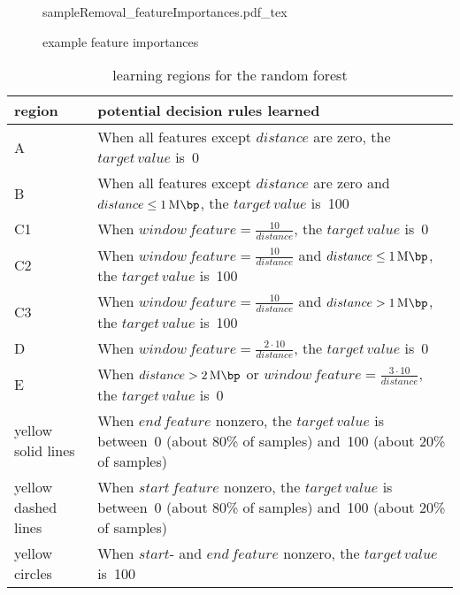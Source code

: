 \begin{figure}[p]
 \centering
 \scriptsize
  {sampleRemoval_featureImportances.pdf_tex}
 \caption{example feature importances}
 \label{fig:improve:featureImportance}
\end{figure}

\begin{table}
 \centering
 \begin{tabular}{lL{9cm}}
  \hline
  \textbf{region} 	& \textbf{potential decision rules learned} \\ \hline
  A		& When all features except $distance$ are zero, the $target\,value$ is~0 \\[1mm]
  B		& When all features except $distance$ are zero and $distance \leq \SI{1}{\mega\bp}$, the $target\,value$ is~100 \\[1mm]
  C1		& When $window\,feature = \frac{10}{distance}$, the $target\,value$ is~0 \\[1mm]
  C2		& When $window\,feature = \frac{10}{distance}$ and $distance \leq \SI{1}{\mega\bp}$, the $target\,value$ is~100 \\[1mm]
  C3		& When $window\,feature = \frac{10}{distance}$ and $distance > \SI{1}{\mega\bp}$, the $target\,value$ is~100 \\[1mm]
  D		& When $window\,feature = \frac{2\cdot10}{distance}$, the $target\,value$  is~0 \\[1mm]
  E		& When $distance > \SI{2}{\mega\bp}$ or $window\,feature = \frac{3\cdot10}{distance}$, the $target\,value$ is~0 \\[1mm]
  yellow solid lines	& When $end\,feature$ nonzero, the $target\,value$ is between~0 (about 80\% of samples) and~100 (about 20\% of samples) \\[1mm]
  yellow dashed lines	& When $start\,feature$ nonzero, the $target\,value$ is between~0 (about 80\% of samples) and~100 (about 20\% of samples) \\[1mm]
  yellow circles	& When $start$- and $end\,feature$ nonzero, the $target\,value$ is~100 \\ \hline
 \end{tabular}
 \caption{learning regions for the random forest}
 \label{tab:improve:learnRegions}
\end{table}

\clearpage
